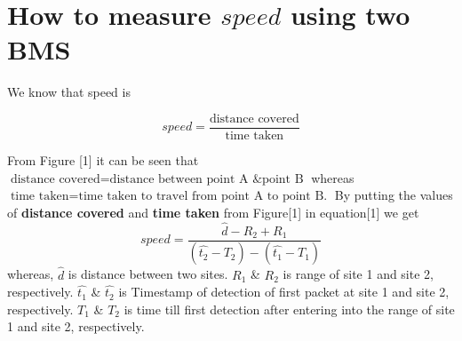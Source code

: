 \documentclass[10pt,twocolumn,letterpaper]{article}
\begin{document}


\section{How to measure $speed$ using two BMS}
We know that speed is

\begin{equation}
   speed = \frac{\text{distance covered}}{\text{time taken}}
\end{equation}

From Figure [1] it can be seen that \(\text{distance covered} = \text{distance between point A \& point B}\) whereas \(\text{time taken} = \text{time taken to travel from point A to point B.}\) By putting the values of \textbf{distance covered} and \textbf{time taken} from Figure[1] in equation[1] we get
\begin{equation}
   speed = \frac{ \hat{d} - R_2 + R_1 }{ (\hat{t_2} - T_2 ) - (\hat{t_1} - T_1 ) }  
\end{equation}
whereas,  $\hat{d}$ is distance between two sites. $R_1$ \& $R_2$ is range of site 1 and site 2, respectively. $\hat{t_1}$ \& $\hat{t_2}$ is Timestamp of detection of first packet at site 1 and site 2, respectively. $T_1$ \& $T_2$ is time till first detection after entering into the range of site 1 and site 2, respectively. 
\end{document}
